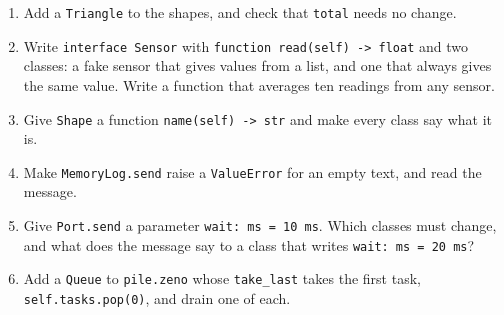 \begin{tryit}
\begin{enumerate}
\item Add a \verb|Triangle| to the shapes, and check that \verb|total|
  needs no change.
\item Write \verb|interface Sensor| with \verb|function read(self) -> float|
  and two classes: a fake sensor that gives values from a list, and
  one that always gives the same value. Write a function that averages
  ten readings from any sensor.
\item Give \verb|Shape| a function \verb|name(self) -> str| and make
  every class say what it is.
\item Make \verb|MemoryLog.send| raise a \verb|ValueError| for an
  empty text, and read the message.
\item Give \verb|Port.send| a parameter \verb|wait: ms = 10 ms|. Which
  classes must change, and what does the message say to a class that
  writes \verb|wait: ms = 20 ms|?
\item Add a \verb|Queue| to \verb|pile.zeno| whose \verb|take_last|
  takes the first task, \verb|self.tasks.pop(0)|, and drain one of
  each.
\end{enumerate}
\end{tryit}
